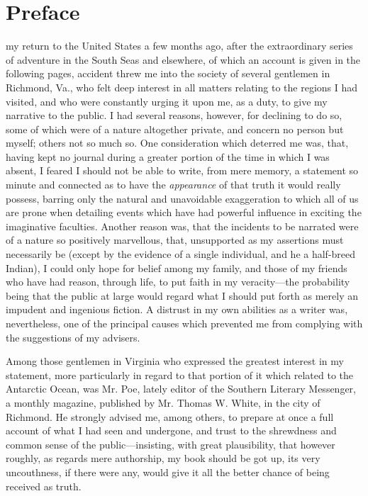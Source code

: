 \section{Preface}
 my return to the United States a few months ago, after the extraordinary
series of adventure in the South Seas and elsewhere, of which an account is
given in the following pages, accident threw me into the society of several
gentlemen in Richmond, Va., who felt deep interest in all matters relating to
the regions I had visited, and who were constantly urging it upon me, as a duty,
to give my narrative to the public. I had several reasons, however, for
declining to do so, some of which were of a nature altogether private, and
concern no person but myself; others not so much so. One consideration which
deterred me was, that, having kept no journal during a greater portion of the
time in which I was absent, I feared I should not be able to write, from mere
memory, a statement so minute and connected as to have the \emph{appearance} of
that truth it would really possess, barring only the natural and unavoidable
exaggeration to which all of us are prone when detailing events which have had
powerful influence in exciting the imaginative faculties. Another reason was,
that the incidents to be narrated were of a nature so positively marvellous,
that, unsupported as my assertions must necessarily be (except by the evidence
of a single individual, and he a half-breed Indian), I could only hope for
belief among my family, and those of my friends who have had reason, through
life, to put faith in my veracity---the probability being that the public at
large would regard what I should put forth as merely an impudent and ingenious
fiction. A distrust in my own abilities as a writer was, nevertheless, one of
the principal causes which prevented me from complying with the suggestions of
my advisers. 

Among those gentlemen in Virginia who expressed the greatest interest in my
statement, more particularly in regard to that portion of it which related to
the Antarctic Ocean, was Mr. Poe, lately editor of the Southern Literary
Messenger, a monthly magazine, published by Mr. Thomas W. White, in the city of
Richmond. He strongly advised me, among others, to prepare at once a full
account of what I had seen and undergone, and trust to the shrewdness and common
sense of the public---insisting, with great plausibility, that however roughly,
as regards mere authorship, my book should be got up, its very uncouthness, if
there were any, would give it all the better chance of being received as
truth. 

